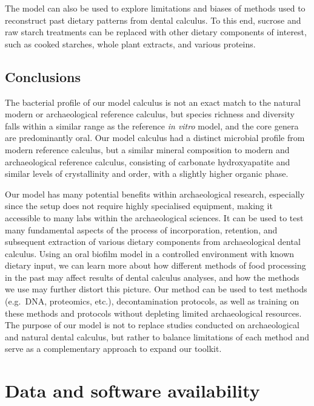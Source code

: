 \documentclass[10pt,a4paper]{article}
\begin{document}
The model can also be used to explore limitations and biases of methods
used to reconstruct past dietary patterns from dental calculus. To this
end, sucrose and raw starch treatments can be replaced with other
dietary components of interest, such as cooked starches, whole plant
extracts, and various proteins.

\subsection*{Conclusions}\label{conclusions}

The bacterial profile of our model calculus is not an exact match to the
natural modern or archaeological reference calculus, but species
richness and diversity falls within a similar range as the reference
\emph{in vitro} model, and the core genera are predominantly oral. Our
model calculus had a distinct microbial profile from modern reference
calculus, but a similar mineral composition to modern and archaeological
reference calculus, consisting of carbonate hydroxyapatite and similar
levels of crystallinity and order, with a slightly higher organic phase.

Our model has many potential benefits within archaeological research,
especially since the setup does not require highly specialised
equipment, making it accessible to many labs within the archaeological
sciences. It can be used to test many fundamental aspects of the process
of incorporation, retention, and subsequent extraction of various
dietary components from archaeological dental calculus. Using an oral
biofilm model in a controlled environment with known dietary input, we
can learn more about how different methods of food processing in the
past may affect results of dental calculus analyses, and how the methods
we use may further distort this picture. Our method can be used to test
methods (e.g.~DNA, proteomics, etc.), decontamination protocols, as well
as training on these methods and protocols without depleting limited
archaeological resources. The purpose of our model is not to replace
studies conducted on archaeological and natural dental calculus, but
rather to balance limitations of each method and serve as a
complementary approach to expand our toolkit.


\section*{Data and software availability} %
\end{document}
